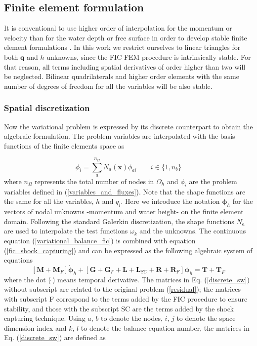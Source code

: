 \subsection{Finite element formulation}
\label{sec:fic_fem} 

It is conventional to use higher order of interpolation for the momentum or velocity than for the water depth or free surface in order to develop stable finite element formulations \cite{hood1974,heniche2000,bercovier1979}. In this work we restrict ourselves to linear triangles for both $\mathbf{q}$ and $h$ unknowns, since the FIC-FEM procedure is intrinsically stable. For that reason, all terms including spatial derivatives of order higher than two will be neglected. Bilinear quadrilaterals and higher order elements with the same number of degrees of freedom for all the variables will be also stable.


\subsubsection{Spatial discretization}

Now the variational problem is expressed by its discrete counterpart to obtain the algebraic formulation. The problem variables are interpolated with the basis functions of the finite elements space as

\begin{equation}
\phi_i = \sum_a^{n_\Omega} N_a(\mathbf{x})\phi_{ai} \qquad i \in \{1,n_b\}
\end{equation}
where $n_\Omega$ represents the total number of nodes in $\Omega_h$ and $\phi_i$ are the problem variables defined in (\ref{variables_and_fluxes}).
Note that the shape functions are the same for all the variables, $h$ and $q_i$.
Here we introduce the notation $\bm{\phi}_h$ for the vectors of nodal unknowns -momentum and water height- on the finite element domain. Following the standard Galerkin discretization, the shape functions $N_a$ are used to interpolate the test functions $\omega_k$ and the unknowns. The continuous equation (\ref{variational_balance_fic}) is combined with equation (\ref{fic_shock_capturing}) and can be expressed as the following algebraic system of equations
\begin{equation} \label{discrete_sw}
[\mathbf{M} + \mathbf{M}_F] \dot{\bm{\phi}}_h
+ [\mathbf{G} + \mathbf{G}_F + \mathbf{L} + \mathbf{L}_{SC} + \mathbf{R} + \mathbf{R}_F] \bm{\phi}_h
= \mathbf{T} + \mathbf{T}_F
\end{equation}
where the dot ($\dot{\ }$) means temporal derivative. The matrices in Eq. (\ref{discrete_sw}) without subscript are related to the original problem (\ref{residual}); the matrices with subscript F correspond to the terms added by the FIC procedure to ensure stability, and those with the subscript SC are the terms added by the shock capturing technique. Using $a$, $b$ to denote the nodes, $i$, $j$ to denote the space dimension index and $k$, $l$ to denote the balance equation number, the matrices in Eq. (\ref{discrete_sw}) are defined as

